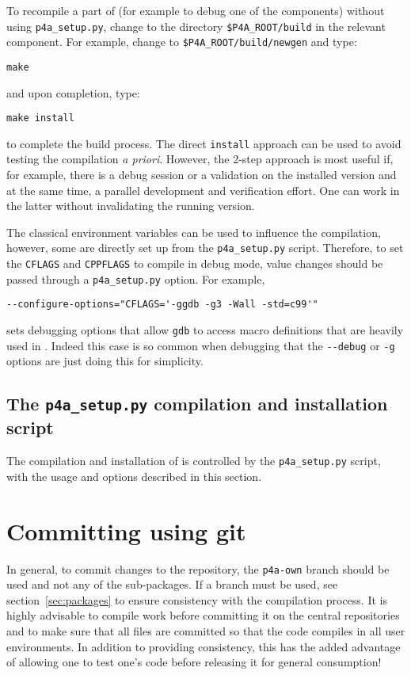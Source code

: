 \documentclass[a4paper]{article}
\begin{document}
To recompile a part of \Apfa (for example to debug
one of the components) without using \verb|p4a_setup.py|, change to
the directory \verb|$P4A_ROOT/build| in the relevant component. For
example, change to \verb|$P4A_ROOT/build/newgen| and type:
\begin{verbatim}
make
\end{verbatim}
and upon completion, type:
\begin{verbatim}
make install
\end{verbatim}
to complete the build process. The direct \texttt{install}
approach can be used to avoid testing the compilation
\emph{a priori}. However, the 2-step
approach is most useful if, for example, there is a debug session or a
validation on the installed version and at the same time, a parallel
development and verification effort. One can work in the latter
without invalidating the running version.

The classical \Aautotools environment variables can be used to influence
the compilation, however, some are directly set up from the \verb|p4a_setup.py|
script. Therefore, to set the \texttt{CFLAGS} and \texttt{CPPFLAGS}
to compile \Apfa in debug mode, value changes should be passed through
a \verb|p4a_setup.py| option. For example,
\begin{verbatim}
--configure-options="CFLAGS='-ggdb -g3 -Wall -std=c99'"
\end{verbatim}
sets debugging options that allow \texttt{gdb} to access macro
definitions that are heavily used in \Apips. Indeed this case is so common
when debugging \Apfa that the \verb|--debug| or \verb|-g| options are just
doing this for simplicity.


\subsection{The \protect\texttt{p4a\_setup.py} compilation and installation
script}
\label{sec:p4a_s-comp-script}

The compilation and installation of \Apfa is controlled by the
\verb|p4a_setup.py| script, with the usage and options described in
this section.



\section{Committing using git}

In general, to commit changes to the \Agit repository, the
\texttt{p4a-own} branch should be used and not any of the \Apfa
sub-packages. If a branch must be used, see section~\ref{sec:packages}
to ensure consistency with the \Apfa compilation process. It is highly
advisable to compile work before
committing it on the central repositories and to make sure that all
files are committed so that the code compiles in all user
environments. In addition to providing
consistency, this has the added advantage of
allowing one to test one's code before releasing it for general
consumption! \smiley
\end{document}
